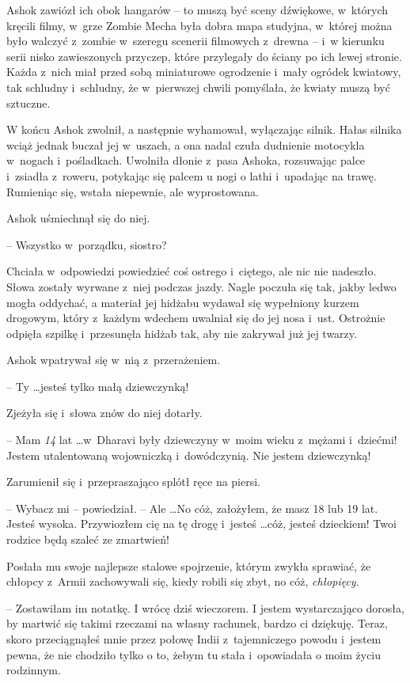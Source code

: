 \documentclass[oneside,polish,11pt,rmheadings]{mwbk}
\begin{document}
Ashok zawiózł ich obok hangarów -- to muszą być sceny dźwiękowe, w~których kręcili filmy, w~grze Zombie Mecha była dobra mapa studyjna, w~której można było walczyć z~zombie w~szeregu scenerii filmowych z~drewna -- i~w kierunku serii nisko zawieszonych przyczep, które przylegały do ściany po ich lewej stronie. Każda z~nich miał przed sobą miniaturowe ogrodzenie i~mały ogródek kwiatowy, tak schludny i~schludny, że w~pierwszej chwili pomyślała, że kwiaty muszą być sztuczne.

W końcu Ashok zwolnił, a następnie wyhamował, wyłączając silnik. Hałas silnika wciąż jednak buczał jej w~uszach, a ona nadal czuła dudnienie motocykla w~nogach i~pośladkach. Uwolniła dłonie z~pasa Ashoka, rozsuwając palce i~zsiadła z~roweru, potykając się palcem u nogi o lathi i~upadając na trawę. Rumieniąc się, wstała niepewnie, ale wyprostowana.

Ashok uśmiechnął się do niej. 

-- Wszystko w~porządku, siostro?

Chciała w~odpowiedzi powiedzieć coś ostrego i~ciętego, ale nic nie nadeszło. Słowa zostały wyrwane z~niej podczas jazdy. Nagle poczuła się tak, jakby ledwo mogła oddychać, a materiał jej hidżabu wydawał się wypełniony kurzem drogowym, który z~każdym wdechem uwalniał się do jej nosa i~ust. Ostrożnie odpięła szpilkę i~przesunęła hidżab tak, aby nie zakrywał już jej twarzy.

Ashok wpatrywał się w~nią z~przerażeniem. 

-- Ty \ldots  jesteś tylko małą dziewczynką!

Zjeżyła się i~słowa znów do niej dotarły. 

-- Mam \textit{14 }lat  \ldots  w~Dharavi były dziewczyny w~moim wieku z~mężami i~dziećmi! Jestem utalentowaną wojowniczką i~dowódczynią. Nie jestem dziewczynką!

Zarumienił się i~przepraszająco splótł ręce na piersi. 

-- Wybacz mi -- powiedział. -- Ale \ldots  No cóż, założyłem, że masz 18 lub 19 lat. Jesteś wysoka. Przywiozłem cię na tę drogę i~jesteś \ldots  cóż, jesteś dzieckiem! Twoi rodzice będą szaleć ze zmartwień!

Posłała mu swoje najlepsze stalowe spojrzenie, którym zwykła sprawiać, że chłopcy z~Armii zachowywali się, kiedy robili się zbyt, no cóż, \textit{chłopięcy}. 

-- Zostawiłam im notatkę. I wrócę dziś wieczorem. I jestem wystarczająco dorosła, by martwić się takimi rzeczami na własny rachunek, bardzo ci dziękuję. Teraz, skoro przeciągnąłeś mnie przez połowę Indii z~tajemniczego powodu i~jestem pewna, że nie chodziło tylko o to, żebym tu stała i~opowiadała o moim życiu rodzinnym.
\end{document}
